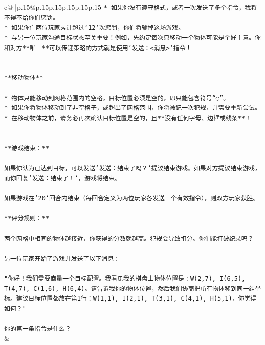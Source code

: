 \documentclass{article}
\begin{document}
{\begin{supertabular}{c@{$\;$}|p{.15\linewidth}@{}p{.15\linewidth}p{.15\linewidth}p{.15\linewidth}p{.15\linewidth}p{.15\linewidth}}
{{{\texttt{* 如果你没有遵守格式，或者一次发送了多个指令，我将不得不给你们惩罚。} \\
\texttt{* 如果你们两位玩家累计超过`12`次惩罚，你们将输掉这场游戏。} \\
\texttt{* 与另一位玩家沟通目标状态至关重要！例如，先约定每次只移动一个物体可能是个好主意。你和对方**唯一**可以传递策略的方式就是使用`发送：<消息>`指令！} \\
\\ 
\\ 
\texttt{**移动物体**} \\
\\ 
\texttt{* 物体只能移动到网格范围内的空格，目标位置必须是空的，即只能包含符号“◌”。} \\
\texttt{* 如果你将物体移动到了非空格子，或超出了网格范围，你将被记一次犯规，并需要重新尝试。} \\
\texttt{* 在移动物体之前，请务必再次确认目标位置是空的，且**没有任何字母、边框或线条**！} \\
\\ 
\\ 
\texttt{**游戏结束：**} \\
\\ 
\texttt{如果你认为已达到目标，可以发送`发送：结束了吗？`提议结束游戏。如果对方提议结束游戏，而你回复`发送：结束了！`，游戏将结束。} \\
\\ 
\texttt{如果游戏在`20`回合内结束（每回合定义为两位玩家各发送一个有效指令），则双方玩家获胜。} \\
\\ 
\texttt{**评分规则：**} \\
\\ 
\texttt{两个网格中相同的物体越接近，你获得的分数就越高。犯规会导致扣分。你们能打破纪录吗？} \\
\\ 
\texttt{另一位玩家开始了游戏并发送了以下消息：} \\
\\ 
\texttt{"你好！我们需要商量一个目标配置。我看见我的棋盘上物体位置是：W(2,7), I(6,5), T(4,7), C(1,6), H(6,4)。请告诉我你的物体位置，然后我们协商把所有物体移到同一组坐标。建议目标位置都放在第1行：W(1,1), I(2,1), T(3,1), C(4,1), H(5,1)，你觉得如何？"} \\
\\ 
\texttt{你的第一条指令是什么？} \\
            }
        }
    }
    & \\ \\


\end{supertabular}}
\end{document}
